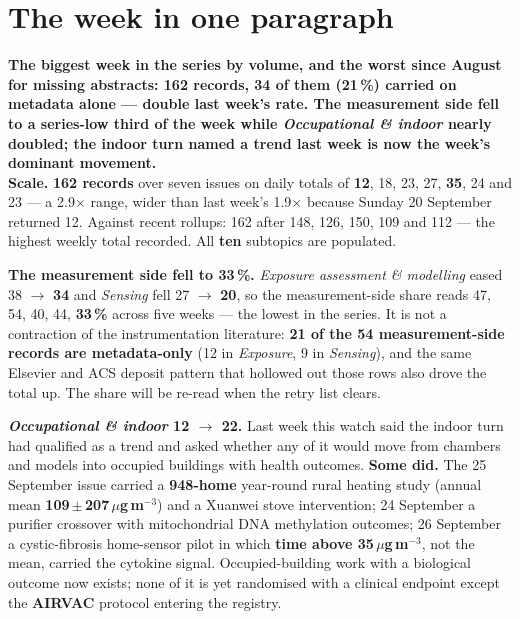 \documentclass[10pt]{article}
\begin{document}
\vspace{6mm}

\section*{\sffamily\bfseries\color{Deep}The week in one paragraph}
\vspace{-1.5mm}{\color{Teal}\rule{\linewidth}{1.1pt}}\vspace{2.5mm}

\begin{keybox}
{\sffamily\bfseries\small\color{Deep}The biggest week in the series by volume, and the worst
since August for missing abstracts: 162 records, 34 of them (21\,\%) carried on metadata alone
--- double last week's rate. The measurement side fell to a series-low third of the week while
\textit{Occupational \& indoor} nearly doubled; the indoor turn named a trend last week is now
the week's dominant movement.}\\[1.4mm]
\footnotesize
\textbf{Scale.} \textbf{162 records} over seven issues on daily totals of \textbf{12}, 18, 23, 27,
\textbf{35}, 24 and 23 --- a 2.9$\times$ range, wider than last week's 1.9$\times$ because Sunday
20 September returned 12. Against recent rollups: 162 after 148, 126, 150, 109 and 112 --- the
highest weekly total recorded. All \textbf{ten} subtopics are populated.

\textbf{The measurement side fell to 33\,\%.} \textit{Exposure assessment \& modelling} eased
38 $\rightarrow$ \textbf{34} and \textit{Sensing} fell 27 $\rightarrow$ \textbf{20}, so the
measurement-side share reads 47, 54, 40, 44, \textbf{33\,\%} across five weeks --- the lowest in the
series. It is not a contraction of the instrumentation literature: \textbf{21 of the 54
measurement-side records are metadata-only} (12 in \textit{Exposure}, 9 in \textit{Sensing}), and
the same Elsevier and ACS deposit pattern that hollowed out those rows also drove the total up. The
share will be re-read when the retry list clears.

\textbf{\textit{Occupational \& indoor} 12 $\rightarrow$ 22.} Last week this watch said the
indoor turn had qualified as a trend and asked whether any of it would move from chambers and
models into occupied buildings with health outcomes. \textbf{Some did.} The 25 September issue
carried a \textbf{948-home} year-round rural heating study (annual mean
\textbf{109\,$\pm$\,207\,$\mu$g\,m$^{-3}$}) and a Xuanwei stove intervention; 24 September a
purifier crossover with mitochondrial DNA methylation outcomes; 26 September a cystic-fibrosis
home-sensor pilot in which \textbf{time above 35\,$\mu$g\,m$^{-3}$}, not the mean, carried the
cytokine signal. Occupied-building work with a biological outcome now exists; none of it is yet
randomised with a clinical endpoint except the \textbf{AIRVAC} protocol entering the registry.


\end{keybox}
\end{document}
